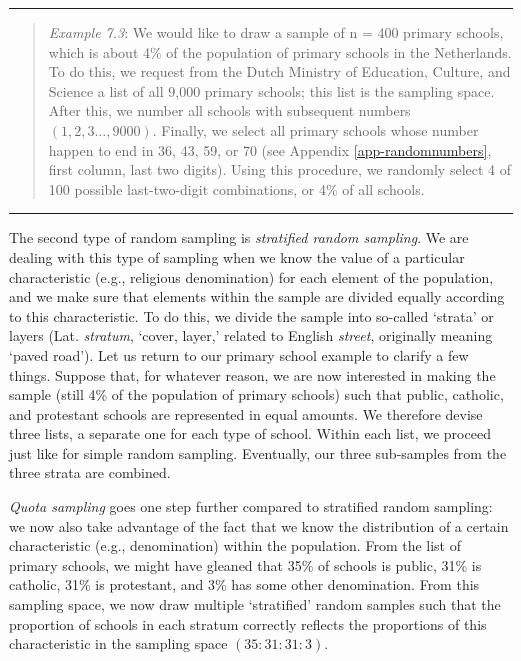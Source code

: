 \documentclass[
]{book}
\begin{document}
\begin{center}\rule{0.5\linewidth}{0.5pt}\end{center}

\begin{quote}
\emph{Example 7.3}: We would like to draw a sample of n = 400 primary schools, which is about 4\% of the population of primary schools in the Netherlands. To do this, we request from the Dutch Ministry of Education, Culture, and Science a list of all 9,000 primary schools; this list is the sampling space. After this, we number all schools with subsequent numbers \((1, 2, 3 \ldots,  9000)\). Finally, we select all primary schools whose number happen to end in 36, 43, 59, or 70 (see Appendix \ref{app-randomnumbers}, first column, last two digits). Using this procedure, we randomly select 4 of 100 possible last-two-digit combinations, or 4\% of all schools.
\end{quote}

\begin{center}\rule{0.5\linewidth}{0.5pt}\end{center}

The second type of random sampling is \emph{stratified random sampling}. We are dealing with this type of sampling when we know the value of a particular characteristic (e.g., religious denomination) for each element of the population, and we make sure that elements within the sample are divided equally according to this characteristic. To do this, we divide the sample into so-called `strata' or layers (Lat. \emph{stratum}, `cover, layer,' related to English \emph{street}, originally meaning `paved road'). Let us return to our primary school example to clarify a few things. Suppose that, for whatever reason, we are now interested in making the sample (still 4\% of the population of primary schools) such that public, catholic, and protestant schools are represented in equal amounts. We therefore devise three lists, a separate one for each type of school. Within each list, we proceed just like for simple random sampling. Eventually, our three sub-samples from the three strata are combined.

\emph{Quota sampling} goes one step further compared to stratified random sampling: we now also take advantage of the fact that we know the distribution of a certain characteristic (e.g., denomination) within the population. From the list of primary schools, we might have gleaned that 35\% of schools is public, 31\% is catholic, 31\% is protestant, and 3\% has some other denomination. From this sampling space, we now draw multiple `stratified' random samples such that the proportion of schools in each stratum correctly reflects the proportions of this characteristic in the sampling space \((35 : 31 : 31 : 3)\).
\end{document}
